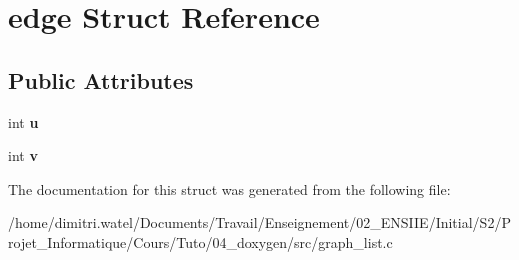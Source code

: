 \hypertarget{structedge}{}\section{edge Struct Reference}
\label{structedge}
\subsection*{Public Attributes}
\begin{DoxyCompactItemize}
\item 
\mbox{\label{structedge_a9169c2521e20f8e0f266e7cd8e38d279}} 
int {\bfseries u}
\item 
\mbox{\label{structedge_a149de160a4ee12cd3c57aab76abc0370}} 
int {\bfseries v}
\end{DoxyCompactItemize}


The documentation for this struct was generated from the following file\+:\begin{DoxyCompactItemize}
\item 
/home/dimitri.\+watel/\+Documents/\+Travail/\+Enseignement/02\+\_\+\+E\+N\+S\+I\+I\+E/\+Initial/\+S2/\+Projet\+\_\+\+Informatique/\+Cours/\+Tuto/04\+\_\+doxygen/src/graph\+\_\+list.\+c\end{DoxyCompactItemize}
